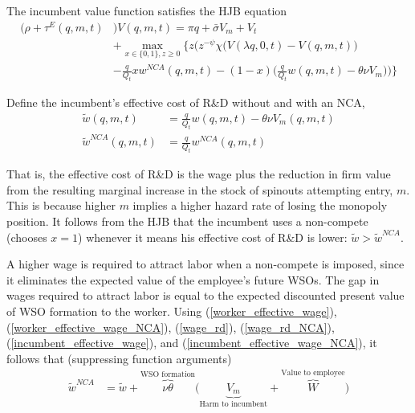 \documentclass[12pt,english]{article}
\theoremstyle{remark}
\begin{document}
The incumbent value function satisfies the HJB equation
\begin{align}
\big(\rho + \tau^E(q,m,t)& \big)V(q,m,t) = \pi q + \bar{\sigma} V_m + V_t  \nonumber \\
&+ \max_{x \in \{0,1\}, z \ge 0} \Bigg\{ z \Big( z^{-\psi} \chi \big( V(\lambda q, 0, t) - V(q,m,t) \big)  \nonumber \\
&- \frac{q}{Q_t} x w^{NCA}(q,m,t) - (1-x) \big( \frac{q}{Q_t} w(q,m,t) - \theta \nu V_m \big)\Big)    \Bigg\} \label{HJB_I}
\end{align}

Define the incumbent's effective cost of R\&D without and with an NCA, 
\begin{align}
\tilde{w}(q,m,t) &= \frac{q}{Q_t} w(q,m,t) - \theta \nu V_m(q,m,t)  \label{incumbent_effective_wage} \\
\tilde{w}^{NCA}(q,m,t) &= \frac{q}{Q_t} w^{NCA}(q,m,t)  \label{incumbent_effective_wage_NCA} 
\end{align}

That is, the effective cost of R\&D is the wage plus the reduction in firm value from the resulting marginal increase in the stock of spinouts attempting entry, $m$. This is because higher $m$ implies a higher hazard rate of losing the monopoly position. It follows from the HJB that the incumbent uses a non-compete (chooses $x = 1$) whenever it means his effective cost of R\&D is lower: $\tilde{w} > \tilde{w}^{NCA}$. 

A higher wage is required to attract labor when a non-compete is imposed, since it eliminates the expected value of the employee's future WSOs. The gap in wages required to attract labor is equal to the expected discounted present value of WSO formation to the worker. Using (\ref{worker_effective_wage}), (\ref{worker_effective_wage_NCA}), (\ref{wage_rd}), (\ref{wage_rd_NCA}), (\ref{incumbent_effective_wage}), and (\ref{incumbent_effective_wage_NCA}), it follows that (suppressing function arguments)
\begin{align}
\tilde{w}^{NCA} &= \tilde{w} + \overbrace{\nu \theta }^{\textrm{WSO formation}} \Bigg( \underbrace{V_m}_{\textrm{Harm to incumbent}} + \overbrace{W}^{\textrm{Value to employee}} \Bigg)
\end{align} 
\end{document}
